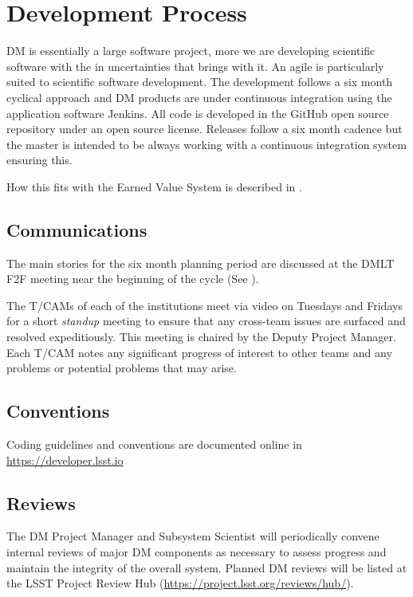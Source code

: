 \section{Development Process} \label{sect:devproc}

DM is essentially a large software project, more we are developing scientific software with the in uncertainties that brings with it. 
An agile \citep{it:agile} is particularly suited to scientific software development.  The development follows a six month  cyclical approach and  DM  products are under continuous
integration using the application software Jenkins. All code is developed in the GitHub open source repository under an open source license.
Releases follow a six month cadence but the master is intended to be always working with a continuous integration system ensuring this.

How this fits with the Earned Value System is described in .


\subsection{Communications}

The main stories for the six month planning period are discussed at the DMLT F2F meeting near the beginning of the cycle (See ). 

The T/CAMs of each of the institutions meet via video on Tuesdays and Fridays for a short \emph{standup} meeting to ensure that any cross-team issues are surfaced and resolved expeditiously.
This meeting is chaired by the Deputy Project Manager.
Each T/CAM notes any significant progress of interest to other teams and any problems or potential problems that may arise.

\subsection{Conventions}
Coding guidelines and conventions are documented online in \url{https://developer.lsst.io}

\subsection{Reviews} \label{sect:reviews}

The DM Project Manager and Subsystem Scientist will periodically convene internal reviews of major DM components as necessary to assess progress and maintain the integrity of the overall system. Planned DM reviews will be listed at the LSST Project Review Hub (\url{https://project.lsst.org/reviews/hub/}).

